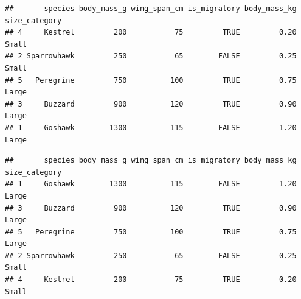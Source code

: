 \documentclass[
]{article}
\newenvironment{Shaded}{\begin{snugshade}}{\end{snugshade}}
\newcommand{\AttributeTok}[1]{\textcolor[rgb]{0.13,0.29,0.53}{#1}}
\newcommand{\CommentTok}[1]{\textcolor[rgb]{0.56,0.35,0.01}{\textit{#1}}}
\newcommand{\ConstantTok}[1]{\textcolor[rgb]{0.56,0.35,0.01}{#1}}
\newcommand{\FunctionTok}[1]{\textcolor[rgb]{0.13,0.29,0.53}{\textbf{#1}}}
\newcommand{\NormalTok}[1]{#1}
\newcommand{\SpecialCharTok}[1]{\textcolor[rgb]{0.81,0.36,0.00}{\textbf{#1}}}
\begin{document}
\begin{Shaded}
\end{Shaded}

\begin{verbatim}
##       species body_mass_g wing_span_cm is_migratory body_mass_kg size_category
## 4     Kestrel         200           75         TRUE         0.20         Small
## 2 Sparrowhawk         250           65        FALSE         0.25         Small
## 5   Peregrine         750          100         TRUE         0.75         Large
## 3     Buzzard         900          120         TRUE         0.90         Large
## 1     Goshawk        1300          115        FALSE         1.20         Large
\end{verbatim}

\begin{Shaded}
\end{Shaded}

\begin{verbatim}
##       species body_mass_g wing_span_cm is_migratory body_mass_kg size_category
## 1     Goshawk        1300          115        FALSE         1.20         Large
## 3     Buzzard         900          120         TRUE         0.90         Large
## 5   Peregrine         750          100         TRUE         0.75         Large
## 2 Sparrowhawk         250           65        FALSE         0.25         Small
## 4     Kestrel         200           75         TRUE         0.20         Small
\end{verbatim}

\begin{Shaded}
\end{Shaded}
\end{document}
